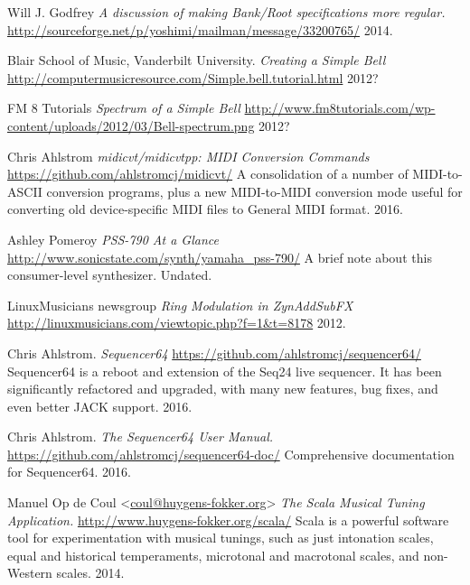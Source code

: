 \begin{thebibliography}{99}

   Will J. Godfrey
   \emph{A discussion of making Bank/Root specifications more regular.}
   \url{http://sourceforge.net/p/yoshimi/mailman/message/33200765/}
   2014.

   Blair School of Music, Vanderbilt University.
   \emph{Creating a Simple Bell}
   \url{http://computermusicresource.com/Simple.bell.tutorial.html}
   2012?

   FM 8 Tutorials
   \emph{Spectrum of a Simple Bell}
   \url{http://www.fm8tutorials.com/wp-content/uploads/2012/03/Bell-spectrum.png}
   2012?

   Chris Ahlstrom
   \emph{midicvt/midicvtpp: MIDI Conversion Commands}
   \url{https://github.com/ahlstromcj/midicvt/}
   A consolidation of a number of MIDI-to-ASCII conversion programs,
   plus a new MIDI-to-MIDI conversion mode useful for converting old
   device-specific MIDI files to General MIDI format.
   2016.

   Ashley Pomeroy
   \emph{PSS-790 At a Glance}
   \url{http://www.sonicstate.com/synth/yamaha\_pss-790/}
   A brief note about this consumer-level synthesizer.
   Undated.

   LinuxMusicians newsgroup
   \emph{Ring Modulation in ZynAddSubFX}
   \url{http://linuxmusicians.com/viewtopic.php?f=1&t=8178}
   2012.

   Chris Ahlstrom.
   \emph{Sequencer64}
   \url{https://github.com/ahlstromcj/sequencer64/}
   Sequencer64 is a reboot and extension of the Seq24 live sequencer.
   It has been significantly refactored and upgraded, with many new features,
   bug fixes, and even better JACK support.
   2016.

   Chris Ahlstrom.
   \emph{The Sequencer64 User Manual.}
   \url{https://github.com/ahlstromcj/sequencer64-doc/}
   Comprehensive documentation for Sequencer64.
   2016.

   Manuel Op de Coul <\url{coul@huygens-fokker.org}>
   \emph{The Scala Musical Tuning Application.}
   \url{http://www.huygens-fokker.org/scala/}
   Scala is a powerful software tool for experimentation with musical
   tunings, such as just intonation scales, equal and historical
   temperaments, microtonal and macrotonal scales, and non-Western scales.
   2014.


\end{thebibliography}
